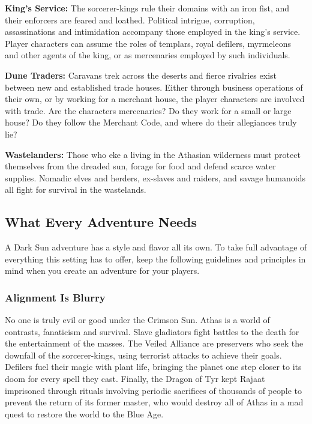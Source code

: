 \textbf{King's Service:} The sorcerer-kings rule their domains with an iron fist, and their enforcers are feared and loathed. Political intrigue, corruption, assassinations and intimidation accompany those employed in the king's service. Player characters can assume the roles of templars, royal defilers, myrmeleons and other agents of the king, or as mercenaries employed by such individuals.

\textbf{Dune Traders:} Caravans trek across the deserts and fierce rivalries exist between new and established trade houses. Either through business operations of their own, or by working for a merchant house, the player characters are involved with trade. Are the characters mercenaries? Do they work for a small or large house? Do they follow the Merchant Code, and where do their allegiances truly lie?

\textbf{Wastelanders:} Those who eke a living in the Athasian wilderness must protect themselves from the dreaded sun, forage for food and defend scarce water supplies. Nomadic elves and herders, ex-slaves and raiders, and savage humanoids all fight for survival in the wastelands.

\subsection{What Every Adventure Needs}
A {\tableheader Dark Sun} adventure has a style and flavor all its own. To take full advantage of everything this setting has to offer, keep the following guidelines and principles in mind when you create an adventure for your players.

\subsubsection{Alignment Is Blurry}
No one is truly evil or good under the Crimson Sun. Athas is a world of contrasts, fanaticism and survival. Slave gladiators fight battles to the death for the entertainment of the masses. The Veiled Alliance are preservers who seek the downfall of the sorcerer-kings, using terrorist attacks to achieve their goals. Defilers fuel their magic with plant life, bringing the planet one step closer to its doom for every spell they cast. Finally, the Dragon of Tyr kept Rajaat imprisoned through rituals involving periodic sacrifices of thousands of people to prevent the return of its former master, who would destroy all of Athas in a mad quest to restore the world to the Blue Age.

